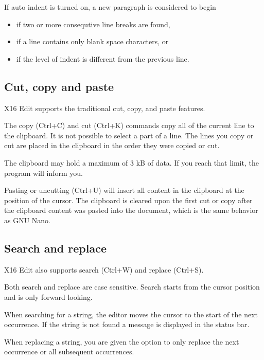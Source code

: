 \documentclass{article}
\begin{document}
        If auto indent is turned on, a new paragraph is considered to begin

        \begin{itemize}
		    \item if two or more consequtive line breaks are found, 
            \item if a line contains only blank space characters, or
		    \item if the level of indent is different from the previous line.
	    \end{itemize}      

    \subsection{Cut, copy and paste}

        X16 Edit supports the traditional cut, copy, and paste features.

        The copy (Ctrl+C) and cut (Ctrl+K) commands copy all of the current line to the clipboard. It is not possible to select 
        a part of a line. The lines you copy or cut are placed in the clipboard in the order they were copied or cut.
        
        The clipboard may hold a maximum of 3 kB of data. If you reach that limit, the program will inform you.

        Pasting or uncutting (Ctrl+U) will insert all content in the clipboard at the position of the cursor. The clipboard
        is cleared upon the first cut or copy after the clipboard content was pasted into the document, which is the
        same behavior as GNU Nano.

    \subsection{Search and replace}

        X16 Edit also supports search (Ctrl+W) and replace (Ctrl+S).

        Both search and replace are case sensitive. Search starts from the
        cursor position and is only forward looking.

        When searching for a string, the editor moves the cursor to the start
        of the next occurrence. If the string is not found a message is
        displayed in the status bar.

        When replacing a string, you are given the option to only replace the
        next occurrence or all subsequent occurrences.
\end{document}
